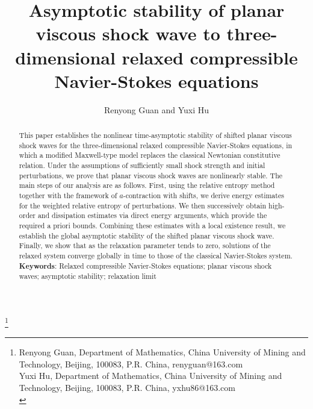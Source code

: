 \documentclass[10pt,reqno]{amsart}
\numberwithin{equation}{section}
\begin{document}
\title[Stability for three-dimensional relaxed CNS]{Asymptotic stability of planar viscous shock wave to three-dimensional relaxed compressible Navier-Stokes equations}
\author{Renyong Guan and Yuxi Hu}
 \thanks{\noindent  Renyong Guan,   Department of Mathematics, China University of Mining and Technology, Beijing, 100083, P.R. China, renyguan@163.com\\
\indent  Yuxi Hu, Department of Mathematics, China University of Mining and Technology, Beijing, 100083, P.R. China, yxhu86@163.com\\
 }
\begin{abstract}
This paper establishes the nonlinear time-asymptotic stability of shifted planar viscous shock waves for the three-dimensional relaxed compressible Navier-Stokes equations, in which a modified Maxwell-type model replaces the classical Newtonian constitutive relation. Under the assumptions of sufficiently small shock strength and initial perturbations, we prove that planar viscous shock waves are nonlinearly stable. The main steps of our analysis are as follows. First, using the relative entropy method together with the framework of $a$-contraction with shifts, we derive energy estimates for the weighted relative entropy of perturbations. We then successively obtain high-order and dissipation estimates via direct energy arguments, which provide the required a priori bounds. Combining these estimates with a local existence result, we establish the global asymptotic stability of the shifted planar viscous shock wave. Finally, we show that as the relaxation parameter tends to zero, solutions of the relaxed system converge globally in time to those of the classical Navier-Stokes system.
 \\[2em]
{\bf Keywords}: Relaxed compressible Navier-Stokes equations;  planar viscous shock waves; asymptotic stability; relaxation limit \\


\end{abstract}
\maketitle
\end{document}
